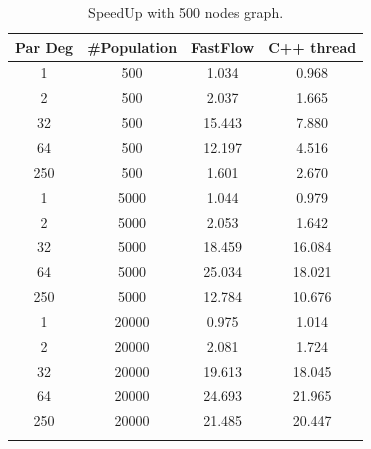 \documentclass[a4paper,10pt]{article}
\begin{document}
\begin{center}
	\small\addtolength{\tabcolsep}{5pt}
	\centering
	\begin{longtable}{|c|c|c|c|}
		\hline
		\textbf{Par Deg} & \textbf{\#Population} & \textbf{FastFlow} & \textbf{C++ thread}  \\ \hline
		1        &  500     & 1.034 &  0.968   \\ \hline
		2        &  500     & 2.037 &  1.665   \\ \hline
		32      &  500     & 15.443 &  7.880   \\ \hline
		64      &  500     & 12.197 &  4.516   \\ \hline
		250    &  500     & 1.601 &  2.670   \\ \hline
		1        &  5000   & 1.044 &  0.979   \\ \hline
		2        &  5000   & 2.053 &  1.642   \\ \hline
		32      &  5000   & 18.459 &  16.084   \\ \hline
		64      &  5000   & 25.034 &  18.021   \\ \hline
		250    &  5000   & 12.784 &  10.676   \\ \hline
		1        &  20000 & 0.975 &   1.014  \\ \hline
		2        &  20000 & 2.081 &   1.724  \\ \hline
		32      &  20000 & 19.613 &   18.045  \\ \hline
		64      &  20000 & 24.693 &   21.965  \\ \hline
		250    &  20000 & 21.485 &   20.447  \\ \hline
		\caption{SpeedUp with 500 nodes graph.}	
		\label{tab:dati500}
	\end{longtable}	
\end{center}
\end{document}
